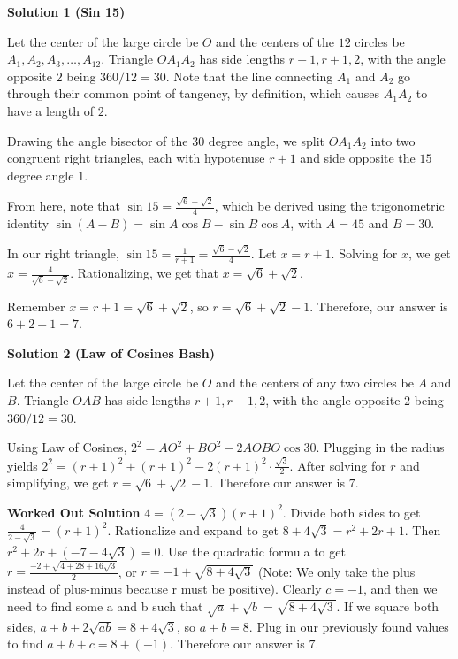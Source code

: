 \begin{enumerate}
\textbf{Solution 1 (Sin 15)}

Let the center of the large circle be $O$ and the centers of the $12$ circles be $A_1, A_2, A_3, \dots, A_{12}$. Triangle $OA_1A_2$ has side lengths $r+1, r+1, 2$, with the angle opposite $2$ being $360/12 = 30$. Note that the line connecting $A_1$ and $A_2$ go through their common point of tangency, by definition, which causes $A_1A_2$ to have a length of $2$.

 Drawing the angle bisector of the $30$ degree angle, we split $OA_1A_2$ into two congruent right triangles, each with hypotenuse $r+1$ and side opposite the $15$ degree angle $1$.

 From here, note that $\sin{15} = \frac{\sqrt{6}-\sqrt{2}}{4}$, which be derived using the trigonometric identity $\sin{(A-B)} = \sin{A} \cos{B} - \sin{B} \cos{A}$, with $A=45$ and $B=30$.

 In our right triangle, $\sin{15} = \frac{1}{r+1} = \frac{\sqrt{6}-\sqrt{2}}{4}$. Let $x=r+1$. Solving for $x$, we get $x = \frac{4}{\sqrt{6}-\sqrt{2}}$. Rationalizing, we get that $x = \sqrt{6}+\sqrt{2}$.

 Remember $x = r+1 = \sqrt{6}+\sqrt{2}$, so $r = \sqrt{6}+\sqrt{2} - 1$. Therefore, our answer is $6+2-1 = \boxed{7}.$




\textbf{Solution 2 (Law of Cosines Bash)}

Let the center of the large circle be $O$ and the centers of any two circles be $A$ and $B$. Triangle $OAB$ has side lengths $r+1, r+1, 2$, with the angle opposite $2$ being $360/12 = 30$.

 Using Law of Cosines, $2^2=AO^2+BO^2-2AOBO\cos30$. Plugging in the radius yields $2^2=(r+1)^2+(r+1)^2-2(r+1)^2\cdot\frac{\sqrt{3}}{2}$. After solving for $r$ and simplifying, we get $r=\sqrt6+\sqrt2-1$. Therefore our answer is $7$.

 \textbf{Worked Out Solution} $4=(2-\sqrt{3})(r+1)^2$. Divide both sides to get $\frac{4}{2-\sqrt{3}}=(r+1)^2$. Rationalize and expand to get $8+4\sqrt{3}=r^2+2r+1$. Then $r^2+2r+(-7-4\sqrt{3})=0$. Use the quadratic formula to get $r=\frac{-2+\sqrt{4+28+16\sqrt{3}}}{2}$, or $r=-1+\sqrt{8+4\sqrt{3}}$ (Note: We only take the plus instead of plus-minus because r must be positive). Clearly $c=-1$, and then we need to find some a and b such that $\sqrt{a} + \sqrt{b} = \sqrt{8+4\sqrt{3}}$. If we square both sides, $a+b+2\sqrt{ab} = 8+4\sqrt{3}$, so $a+b=8$. Plug in our previously found values to find $a+b+c=8+(-1)$. Therefore our answer is $7$.


\end{enumerate}
